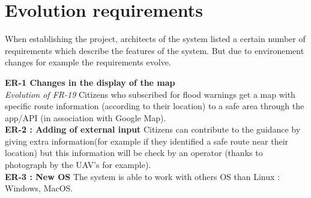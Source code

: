 \section{Evolution requirements}
When establishing the project, architects of the system listed a certain number of requirements which describe the features of the system. But due to environement changes for example the requirements evolve.

\textbf{ER-1 Changes in the display of the map } \\
\textit { Evolution of FR-19 } Citizens who subscribed for flood warnings get a map with specific route information (according to their location) to a safe area through the app/API (in association with Google Map). \\

\textbf{ER-2 : Adding of external input} Citizens can contribute to the guidance by giving extra information(for example if they identified a safe route near their location) but this information will be check by an operator (thanks to photograph by the UAV's for example). \\

\textbf{ER-3 : New OS } The system is able to work with others OS than Linux : Windows, MacOS.

